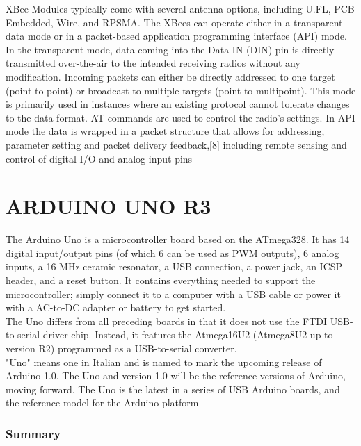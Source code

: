\documentclass[a4paper, 12pt, notitlepage]{report}
\begin{document}
XBee Modules typically come with several antenna options, including U.FL, PCB Embedded, Wire, and RPSMA.
The XBees can operate either in a transparent data mode or in a packet-based application programming interface (API) mode. In the transparent mode, data coming into the Data IN (DIN) pin is directly transmitted over-the-air to the intended receiving radios without any modification. Incoming packets can either be directly addressed to one target (point-to-point) or broadcast to multiple targets (point-to-multipoint). This mode is primarily used in instances where an existing protocol cannot tolerate changes to the data format. AT commands are used to control the radio’s settings. In API mode the data is wrapped in a packet structure that allows for addressing, parameter setting and packet delivery feedback,[8] including remote sensing and control of digital I/O and analog input pins\\

\section{ARDUINO UNO R3}

The Arduino Uno is a microcontroller board based on the ATmega328. It has 14 digital input/output pins (of which 6 can be used as PWM outputs), 6 analog inputs, a 16 MHz ceramic resonator, a USB connection, a power jack, an ICSP header, and a reset button. It contains everything needed to support the microcontroller; simply connect it to a computer with a USB cable or power it with a AC-to-DC adapter or battery to get started.\\

The Uno differs from all preceding boards in that it does not use the FTDI USB-to-serial driver chip. Instead, it features the Atmega16U2 (Atmega8U2 up to version R2) programmed as a USB-to-serial converter.\\

"Uno" means one in Italian and is named to mark the upcoming release of Arduino 1.0. The Uno and version 1.0 will be the reference versions of Arduino, moving forward. The Uno is the latest in a series of USB Arduino boards, and the reference model for the Arduino platform\\


\subsubsection{Summary}
\end{document}
